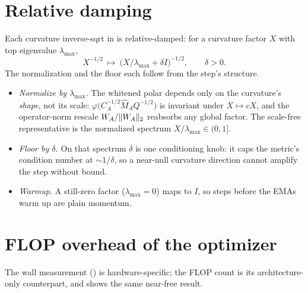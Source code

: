 \documentclass[11pt]{article}
\DeclarePairedDelimiter{\norm}{\lVert}{\rVert}
\newcommand{\polar}{\varphi}                 %
\theoremstyle{plain}
\theoremstyle{definition}
\theoremstyle{remark}
\begin{document}
\section{Relative damping}
\label{app:damping}
Each curvature inverse-sqrt in  is relative-damped: for a curvature factor $X$ with top eigenvalue $\lambda_{\max}$,
\begin{equation*}
  X^{-1/2}\ \longmapsto\ \big(X/\lambda_{\max}+\delta I\big)^{-1/2},\qquad \delta>0 .
\end{equation*}
The normalization and the floor each follow from the step's structure.
\begin{itemize}[leftmargin=1.5em,itemsep=2pt,topsep=2pt]
  \item \emph{Normalize by $\lambda_{\max}$.} The whitened polar depends only on the curvature's \emph{shape}, not its scale: $\polar\!\big(C_A^{-1/2}\hat M_A Q^{-1/2}\big)$ is invariant under $X\mapsto cX$, and the operator-norm rescale $W_A/\norm{W_A}_2$ reabsorbs any global factor. The scale-free representative is the normalized spectrum $X/\lambda_{\max}\in(0,1]$.
  \item \emph{Floor by $\delta$.} On that spectrum $\delta$ is one conditioning knob: it caps the metric's condition number at ${\sim}1/\delta$, so a near-null curvature direction cannot amplify the step without bound.
  \item \emph{Warmup.} A still-zero factor ($\lambda_{\max}=0$) maps to $I$, so steps before the EMAs warm up are plain momentum.
\end{itemize}

\section{FLOP overhead of the optimizer}
\label{app:flops}
The wall measurement () is hardware-specific; the FLOP count is
its architecture-only counterpart, and shows the same near-free result.
\end{document}
